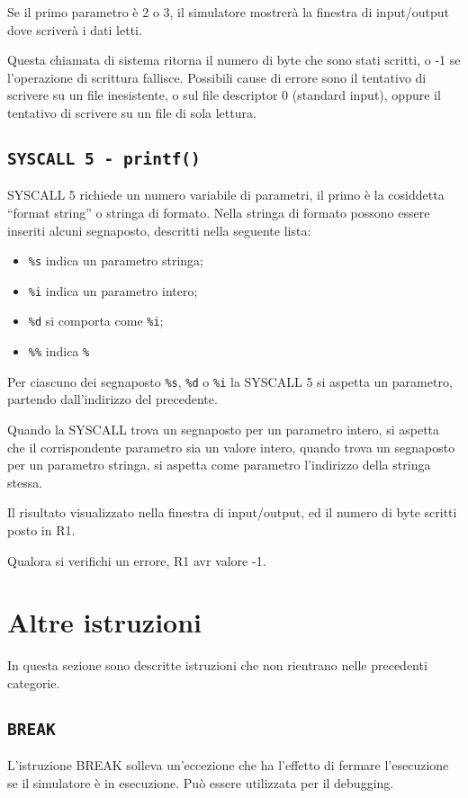 \documentclass[12pt]{report}
\begin{document}
Se il primo parametro \`{e} 2 o 3, il simulatore mostrer\`{a} la finestra di input/output dove scriver\`{a} i dati letti.

Questa chiamata di sistema ritorna il numero di byte che sono stati scritti, o -1 se l'operazione di scrittura fallisce. 
Possibili cause di errore sono il tentativo di scrivere su un file inesistente, o sul file descriptor 0 (standard input), 
oppure il tentativo di scrivere su un file di sola lettura.

\subsection{\texttt{SYSCALL 5 - printf()}}
SYSCALL 5 richiede un numero variabile di parametri, il primo \`{e} la cosiddetta
``format string'' o stringa di formato. Nella stringa di formato possono essere inseriti alcuni segnaposto,
descritti nella seguente lista:
\begin{itemize}
	\item \texttt{\%s} indica un parametro stringa;
	\item \texttt{\%i} indica un parametro intero;
	\item \texttt{\%d} si comporta come \texttt{\%i};
	\item \texttt{\%\%} indica \texttt{\%}
\end{itemize}

Per ciascuno dei segnaposto \texttt{\%s}, \texttt{\%d} o \texttt{\%i} la SYSCALL 5
si aspetta un parametro, partendo dall'indirizzo del precedente.

Quando la SYSCALL trova un segnaposto per un parametro intero, si aspetta che
il corrispondente parametro sia un valore intero, quando trova un segnaposto per un 
parametro stringa, si aspetta come parametro l'indirizzo della stringa stessa.

Il risultato  visualizzato nella finestra di input/output, ed il numero di byte scritti 
 posto in R1.

Qualora si verifichi un errore, R1 avr valore -1.

\section{Altre istruzioni}
In questa sezione sono descritte istruzioni che non rientrano nelle precedenti categorie.
\subsection{\texttt{BREAK}}
L'istruzione BREAK solleva un'eccezione che ha l'effetto di fermare l'esecuzione 
se il simulatore \`{e} in esecuzione. Pu\`{o} essere utilizzata per il debugging.
\end{document}
